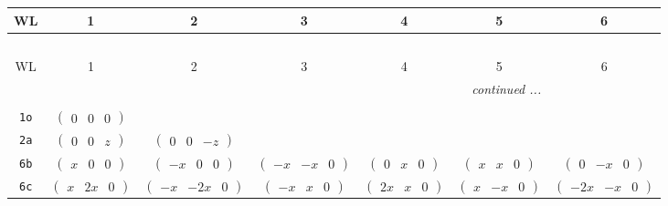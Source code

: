 \documentclass[fleqn,9pt,landscape]{jsarticle}
\begin{document}
\begin{center}
\renewcommand{\arraystretch}{1.2}
\begin{longtable}{ccccccc}
 \hline \hline
WL & 1 & 2 & 3 & 4 & 5 & 6 \\ \hline \endfirsthead

\multicolumn{6}{l}{\tablename\ \thetable{}} \\
 \hline \hline
WL & 1 & 2 & 3 & 4 & 5 & 6 \\ \hline \endhead

 \hline \hline
\multicolumn{6}{r}{\footnotesize\it continued ...} \\ \endfoot

 \hline \hline
\multicolumn{6}{r}{} \\ \endlastfoot

{\tt 1o} & $ \begin{pmatrix} 0 & 0 & 0 \end{pmatrix} $ & $  $ & $  $ & $  $ & $  $ & $  $ \\ \hline
{\tt 2a} & $ \begin{pmatrix} 0 & 0 & z \end{pmatrix} $ & $ \begin{pmatrix} 0 & 0 & - z \end{pmatrix} $ & $  $ & $  $ & $  $ & $  $ \\ \hline
{\tt 6b} & $ \begin{pmatrix} x & 0 & 0 \end{pmatrix} $ & $ \begin{pmatrix} - x & 0 & 0 \end{pmatrix} $ & $ \begin{pmatrix} - x & - x & 0 \end{pmatrix} $ & $ \begin{pmatrix} 0 & x & 0 \end{pmatrix} $ & $ \begin{pmatrix} x & x & 0 \end{pmatrix} $ & $ \begin{pmatrix} 0 & - x & 0 \end{pmatrix} $ \\ \hline
{\tt 6c} & $ \begin{pmatrix} x & 2 x & 0 \end{pmatrix} $ & $ \begin{pmatrix} - x & - 2 x & 0 \end{pmatrix} $ & $ \begin{pmatrix} - x & x & 0 \end{pmatrix} $ & $ \begin{pmatrix} 2 x & x & 0 \end{pmatrix} $ & $ \begin{pmatrix} x & - x & 0 \end{pmatrix} $ & $ \begin{pmatrix} - 2 x & - x & 0 \end{pmatrix} $ \\ \hline

\end{longtable}
\end{center}
\end{document}
